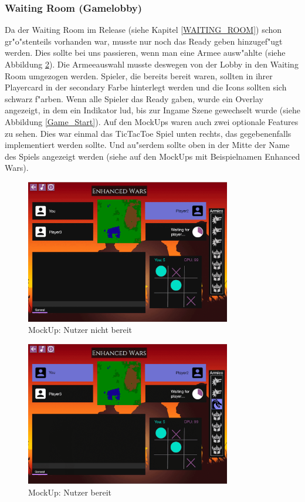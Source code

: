 \documentclass[12pt, titlepage]{scrartcl}
\newcommand{\RN}[1]{%
	\textup{\uppercase\expandafter{\romannumeral#1}}%
}
\begin{document}
		    \subsubsection{Waiting Room (Gamelobby)}
		        Da der Waiting Room im Release \RN{2} (siehe Kapitel \ref{WAITING_ROOM}) schon gr"o"stenteils vorhanden war, musste nur noch das Ready geben hinzugef"ugt werden. Dies sollte bei uns passieren, wenn man eine Armee ausw"ahlte (siehe Abbildung \ref{Ready}). Die Armeeauswahl musste deswegen von der Lobby in den Waiting Room umgezogen werden. Spieler, die bereits bereit waren, sollten in ihrer Playercard in der secondary Farbe hinterlegt werden und die Icons sollten sich schwarz f"arben. Wenn alle Spieler das Ready gaben, wurde ein Overlay angezeigt, in dem ein Indikator lud, bis zur Ingame Szene gewechselt wurde (siehe Abbildung \ref{Game_Start}). Auf den MockUps waren auch zwei optionale Features zu sehen. Dies war einmal das TicTacToe Spiel unten rechts, das gegebenenfalls implementiert werden sollte. Und au"serdem sollte oben in der Mitte der Name des Spiels angezeigt werden (siehe auf den MockUps mit Beispielnamen \glqq Enhanced Wars\grqq). \\
		        \begin{figure}[H] 
    				\centering
    				\includegraphics[width=0.8\textwidth]{images/mockUps/NotReady.png}
    				\caption{MockUp: Nutzer nicht bereit}
    				\label{Not_Ready}
			    \end{figure}
			    \begin{figure}[H] 
    				\centering
    				\includegraphics[width=0.8\textwidth]{images/mockUps/Ready.png}
    				\caption{MockUp: Nutzer bereit}
    				\label{Ready}
			    \end{figure}
\end{document}
